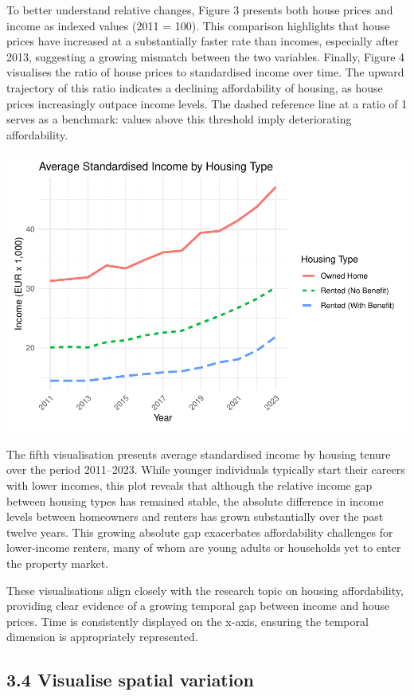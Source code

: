 \documentclass[
]{article}
\begin{document}
To better understand relative changes, Figure 3 presents both house
prices and income as indexed values (2011 = 100). This comparison
highlights that house prices have increased at a substantially faster
rate than incomes, especially after 2013, suggesting a growing mismatch
between the two variables. Finally, Figure 4 visualises the ratio of
house prices to standardised income over time. The upward trajectory of
this ratio indicates a declining affordability of housing, as house
prices increasingly outpace income levels. The dashed reference line at
a ratio of 1 serves as a benchmark: values above this threshold imply
deteriorating affordability.

\begin{center}\includegraphics[width=0.52\linewidth,height=0.3\textheight]{rMarkdownProgrammingForEconomistsTutorial1Group6_files/figure-latex/visualise temporal variation three-1} \end{center}

The fifth visualisation presents average standardised income by housing
tenure over the period 2011--2023. While younger individuals typically
start their careers with lower incomes, this plot reveals that although
the relative income gap between housing types has remained stable, the
absolute difference in income levels between homeowners and renters has
grown substantially over the past twelve years. This growing absolute
gap exacerbates affordability challenges for lower-income renters, many
of whom are young adults or households yet to enter the property market.

These visualisations align closely with the research topic on housing
affordability, providing clear evidence of a growing temporal gap
between income and house prices. Time is consistently displayed on the
x-axis, ensuring the temporal dimension is appropriately represented.

\subsection{3.4 Visualise spatial
variation}\label{visualise-spatial-variation}
\end{document}
